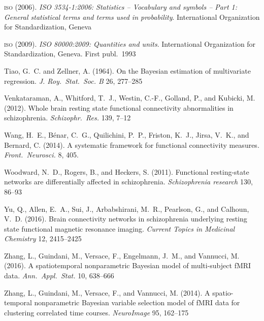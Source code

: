 \documentclass[%
]{frontiersSCNS-nologo} %
\renewcommand*{\|}{\mathpunct{|}}%
\begin{document}
\begin{thebibliography}{156}
\textsc{iso} (2006).
\newblock \emph{ISO 3534-1:2006: Statistics -- Vocabulary and symbols -- Part
  1: General statistical terms and terms used in probability}.
\newblock International Organization for Standardization, Geneva

\textsc{iso} (2009).
\newblock \emph{ISO 80000:2009: Quantities and units}.
\newblock International Organization for Standardization, Geneva.
\newblock First publ.\ 1993

Tiao, G.~C. and Zellner, A. (1964).
\newblock On the {Bayesian} estimation of multivariate regression.
\newblock \emph{J. Roy.\ Stat.\ Soc. B} 26, 277--285

Venkataraman, A., Whitford, T.~J., Westin, C.-F., Golland, P., and Kubicki, M.
  (2012).
\newblock Whole brain resting state functional connectivity abnormalities in
  schizophrenia.
\newblock \emph{Schizophr.\ Res.} 139, 7--12

Wang, H.~E., B{\'e}nar, C.~G., Quilichini, P.~P., Friston, K.~J., Jirsa, V.~K.,
  and Bernard, C. (2014).
\newblock A systematic framework for functional connectivity measures.
\newblock \emph{Front.\ Neurosci.} 8, 405.
\newblock {}

Woodward, N.~D., Rogers, B., and Heckers, S. (2011).
\newblock Functional resting-state networks are differentially affected in
  schizophrenia.
\newblock \emph{Schizophrenia research} 130, 86--93

Yu, Q., Allen, E.~A., Sui, J., Arbabshirani, M.~R., Pearlson, G., and Calhoun,
  V.~D. (2016).
\newblock Brain connectivity networks in schizophrenia underlying resting state
  functional magnetic resonance imaging.
\newblock \emph{Current Topics in Medicinal Chemistry} 12, 2415--2425

Zhang, L., Guindani, M., Versace, F., Engelmann, J.~M., and Vannucci, M.
  (2016).
\newblock A spatiotemporal nonparametric {Bayesian} model of multi-subject
  {fMRI} data.
\newblock \emph{Ann.\ Appl.\ Stat.} 10, 638--666

Zhang, L., Guindani, M., Versace, F., and Vannucci, M. (2014).
\newblock A spatio-temporal nonparametric {Bayesian} variable selection model
  of {fMRI} data for clustering correlated time courses.
\newblock \emph{NeuroImage} 95, 162--175

\end{thebibliography}
\end{document}

